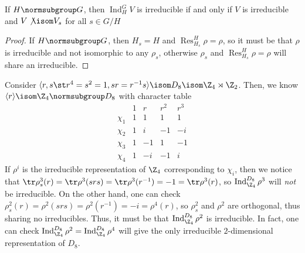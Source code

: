 \documentclass[11pt,leqno,oneside]{amsbook}
\newcommand{\Res}{\operatorname{Res}}
\newcommand{\Ind}{\operatorname{Ind}}
\numberwithin{thm}{section}
\begin{document}
\begin{cor}
  If \(H \normsubgroup G\), then \(\Ind_H^G V\) is irreducible if and
  only if \(V\) is irreducible and \(V \not \isom V_s\) for all \(s \in G/H\)
\end{cor}
\begin{proof}
  If \(H \normsubgroup G\), then \(H_s = H\) and \(\Res_{H_s}^H \rho =
  \rho\), so it must be that \(\rho\) is irreducible and not
  isomorphic to any \(\rho_s\), otherwise \(\rho_s\) and
  \(\Res_{H_s}^H \rho = \rho\) will share an irreducible.
\end{proof}
\begin{example}
  Consider \(\langle r,s \st r^4 = s^2 = 1, sr = r^{-1}s \rangle \isom
  D_8 \isom \Z_4 \rtimes \Z_2\). Then, we know \(\langle r \rangle
  \isom \Z_4
  \normsubgroup D_8\) with character table \[
    \begin{array}{c|cccc}
      &1&r&r^2&r^3 \\
      \hline
      \chi_1 & 1 & 1 & 1 & 1 \\
      \chi_2 & 1 & i & -1 & -i\\
      \chi_3 & 1 & -1 & 1 & -1 \\
      \chi_4 & 1 & -i & -1 & i
    \end{array}
  \]
  If \(\rho^i\) is the irreducible representation of \(\Z_4\)
  corresponding to \(\chi_i\), then we notice that \(\tr \rho^3_s(r) =
  \tr \rho^3(srs) = \tr \rho^3(r^{-1}) = -1 = \tr \rho^3(r)\), so
  \(\Ind_{\Z_4}^{D_8} 
  \rho^3\) will \emph{not} be irreducible. On the other hand, one can
  check \(\rho^2_s(r) = \rho^2(srs) = \rho^2(r^{-1}) = -i = \rho^4(r)\), so
  \(\rho^2_s\) and \(\rho^2\) are orthogonal, thus sharing no
  irreducibles. Thus, it must be that \(\Ind_{\Z_4}^{D_8} \rho^2\) is
  irreducible. In fact, one can check \(\Ind_{\Z_4}^{D_8} \rho^2 =
  \Ind_{\Z_4}^{D_8} \rho^4\) will give the only irreducible
  \(2\)-dimensional representation of \(D_8\).
\end{example}
\end{document}
